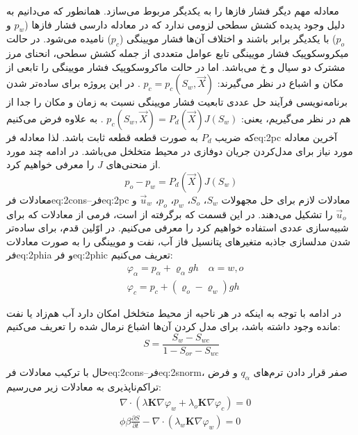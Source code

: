 معادله مهم دیگر فشار فاز‌ها را به یکدیگر مربوط می‌سازد. همانطور که می‌دانیم به دلیل وجود پدیده کشش سطحی لزومی ندارد که در معادله دارسی  فشار فازها ($p_w$ و $p_o$) با یکدیگر برابر باشند و اختلاف آن‌ها فشار مویینگی ($p_c$) نامیده می‌شود. در حالت میکروسکوپیک فشار مویینگی تابع عوامل متعددی از جمله کشش سطحی، انحنای مرز مشترک دو سیال و ‌خ{} می‌باشد. اما در حالت ماکروسکوپیک فشار مویینگی را تابعی از مکان و اشباع در نظر می‌گیرند:
 $p_c = p_c(S_w,\vec{X})$ .
در این پروژه برای ساده‌تر شدن برنامه‌نویسی فر‌آیند حل عددی تابعیت فشار مویینگی نسبت به زمان و مکان را جدا از هم در نظر می‌گیریم، یعنی: 
$p_c(S_w,\vec{X})=P_d(\vec{X}) J(S_w) $ .
به علاوه فرض می‌کنیم که ضریب $P_d$ به صورت قطعه قطعه ثابت باشد. لذا معادله ‌فر{eq:2pc} آخرین معادله مورد نیاز برای مدل‌کردن جریان دوفازی در محیط متخلخل می‌باشد. در ادامه چند مورد از منحنی‌های $J$ را معرفی خواهیم کرد.
\begin{equation}
\label{eq:2pc}
p_o-p_w=P_d(\vec{X})J(S_w)
\end{equation}
معادلات ‌فر{eq:2cons}--‌فر{eq:2pc} معادلات لازم برای حل مجهولات
$S_w$، $S_o$، $p_w$، $p_o$،  
$\vec{u}_w$
 و
$\vec{u}_o$
 را تشکیل می‌دهند. 
در این قسمت که برگرفته از  است، فرمی از معادلات که برای شبیه‌سازی عددی استفاده خواهیم کرد را معرفی می‌‌کنیم. در اوّلین قدم، برای ساده‌تر شدن مدلسازی جاذبه متغیر‌های پتانسیل فاز آب، نفت و مویینگی را به صورت معادلات ‌فر{eq:2phia} و ‌فر{eq:2phic} تعریف می‌کنیم:
\begin{align}
\label{eq:2phia}
&\varphi_\alpha = p_\alpha + \varrho_\alpha g h \quad \alpha=w,o\\
\label{eq:2phic}
&\varphi_c = p_c + (\varrho_o - \varrho_w ) g h 
\end{align} 

در ادامه با توجه به اینکه در هر ناحیه از محیط متخلخل امکان دارد آب هم‌زاد یا نفت مانده وجود داشته باشد، برای مدل کردن آن‌ها اشباع نرمال شده را تعریف می‌کنیم:
\begin{equation}
\label{eq:2snorm}
S=\frac{S_w-S_{wc}}{1-S_{or}-S_{wc}}
\end{equation}

حال با ترکیب معادلات ‌فر{eq:2cons}--‌فر{eq:2snorm}، صفر قرار دادن ترم‌های $q_\alpha$ و فرض تراکم‌ناپذیری به معادلات زیر می‌رسیم:
\begin{align}
	\label{eq:2comp1}
&\nabla \cdot (\lambda\textbf{K}\nabla\varphi_w + \lambda_o\textbf{K}\nabla\varphi_c) = 0 \\
	\label{eq:2comp2}
&\phi \beta \frac{\partial S}{\partial t} -
\nabla \cdot (\lambda_w\textbf{K}\nabla\varphi_w) = 0
\end{align} 

